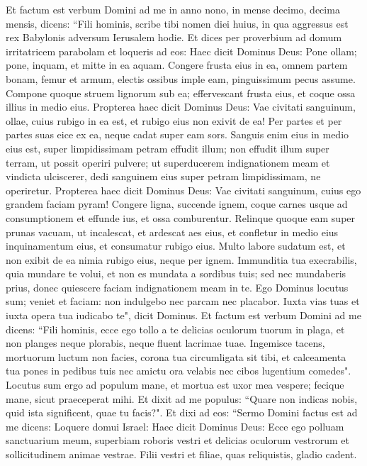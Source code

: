\begin{biblechapter}  
\verse Et factum est verbum Domini ad me in anno nono, in mense decimo, decima mensis, dicens: 
\verse “Fili hominis, scribe tibi nomen diei huius, in qua aggressus est rex Babylonis adversum Ierusalem hodie. 
\verse Et dices per proverbium ad domum irritatricem parabolam et loqueris ad eos: Haec dicit Dominus Deus: Pone ollam; pone, inquam, et mitte in ea aquam. 
\verse Congere frusta eius in ea, omnem partem bonam, femur et armum, electis ossibus imple eam, 
\verse pinguissimum pecus assume. Compone quoque struem lignorum sub ea; effervescant frusta eius, et coque ossa illius in medio eius. 
\verse Propterea haec dicit Dominus Deus: Vae civitati sanguinum, ollae, cuius rubigo in ea est, et rubigo eius non exivit de ea! Per partes et per partes suas eice ex ea, neque cadat super eam sors. 
\verse Sanguis enim eius in medio eius est, super limpidissimam petram effudit illum; non effudit illum super terram, ut possit operiri pulvere; 
\verse ut superducerem indignationem meam et vindicta ulciscerer, dedi sanguinem eius super petram limpidissimam, ne operiretur. 
\verse Propterea haec dicit Dominus Deus: Vae civitati sanguinum, cuius ego grandem faciam pyram! 
\verse Congere ligna, succende ignem, coque carnes usque ad consumptionem et effunde ius, et ossa comburentur. 
\verse Relinque quoque eam super prunas vacuam, ut incalescat, et ardescat aes eius, et confletur in medio eius inquinamentum eius, et consumatur rubigo eius. 
\verse Multo labore sudatum est, et non exibit de ea nimia rubigo eius, neque per ignem. 
\verse Immunditia tua execrabilis, quia mundare te volui, et non es mundata a sordibus tuis; sed nec mundaberis prius, donec quiescere faciam indignationem meam in te. 
\verse Ego Dominus locutus sum; veniet et faciam: non indulgebo nec parcam nec placabor. Iuxta vias tuas et iuxta opera tua iudicabo te", dicit Dominus. 
\verse Et factum est verbum Domini ad me dicens: 
\verse “Fili hominis, ecce ego tollo a te delicias oculorum tuorum in plaga, et non planges neque plorabis, neque fluent lacrimae tuae. 
\verse Ingemisce tacens, mortuorum luctum non facies, corona tua circumligata sit tibi, et calceamenta tua pones in pedibus tuis nec amictu ora velabis nec cibos lugentium comedes". 
\verse Locutus sum ergo ad populum mane, et mortua est uxor mea vespere; fecique mane, sicut praeceperat mihi. 
\verse Et dixit ad me populus: “Quare non indicas nobis, quid ista significent, quae tu facis?". 
\verse Et dixi ad eos: “Sermo Domini factus est ad me dicens: 
\verse Loquere domui Israel: Haec dicit Dominus Deus: Ecce ego polluam sanctuarium meum, superbiam roboris vestri et delicias oculorum vestrorum et sollicitudinem animae vestrae. Filii vestri et filiae, quas reliquistis, gladio cadent. 

\end{biblechapter}
